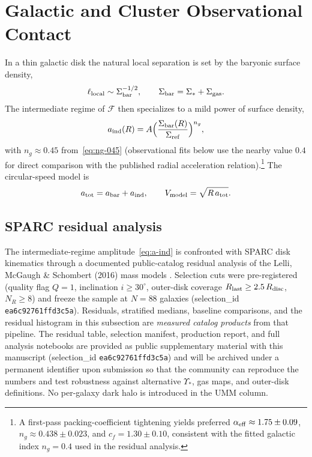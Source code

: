 \documentclass[11pt,a4paper]{article}
\begin{document}
\section{Galactic and Cluster Observational Contact}
\label{sec:galactic}

In a thin galactic disk the natural local separation is set by the baryonic surface density,
\[
\ell_{\rm local}\sim\Sigma_{\rm bar}^{-1/2},\qquad\Sigma_{\rm bar}=\Sigma_*+\Sigma_{\rm gas}.
\]
The intermediate regime of \(\mathcal{F}\) then specializes to a mild power of surface density,
\begin{equation}
a_{\rm ind}(R)=A\Bigl(\frac{\Sigma_{\rm bar}(R)}{\Sigma_{\rm ref}}\Bigr)^{n_g},
\label{eq:a-ind}
\end{equation}
with \(n_g\approx 0.45\) from~\eqref{eq:ng-045} (observational fits below use the nearby value \(0.4\) for direct comparison with the published radial acceleration relation).\footnote{A first-pass packing-coefficient tightening yields preferred \(\alpha_{\rm eff}\approx 1.75\pm 0.09\), \(n_g\approx 0.438\pm 0.023\), and \(c_f=1.30\pm 0.10\), consistent with the fitted galactic index \(n_g=0.4\) used in the residual analysis.} The circular-speed model is
\begin{equation}
a_{\rm tot}=a_{\rm bar}+a_{\rm ind},\qquad
V_{\rm model}=\sqrt{R\,a_{\rm tot}}.
\label{eq:Vmodel}
\end{equation}

\subsection{SPARC residual analysis}
\label{sec:SPARC}

The intermediate-regime amplitude~\eqref{eq:a-ind} is confronted with SPARC disk kinematics through a documented public-catalog residual analysis of the Lelli, McGaugh \& Schombert (2016) mass models \cite{Lelli2016,McGaugh2016}. Selection cuts were pre-registered (quality flag \(Q=1\), inclination \(i\geq 30^\circ\), outer-disk coverage \(R_{\rm last}\geq 2.5\,R_{\rm disc}\), \(N_R\geq 8\)) and freeze the sample at \(N=88\) galaxies (selection\_id \texttt{ea6c92761ffd3c5a}). Residuals, stratified medians, baseline comparisons, and the residual histogram in this subsection are \emph{measured catalog products} from that pipeline. The residual table, selection manifest, production report, and full analysis notebooks are provided as public supplementary material with this manuscript (selection\_id \texttt{ea6c92761ffd3c5a}) and will be archived under a permanent identifier upon submission so that the community can reproduce the numbers and test robustness against alternative \(\Upsilon_*\), gas maps, and outer-disk definitions. No per-galaxy dark halo is introduced in the UMM column.
\end{document}
